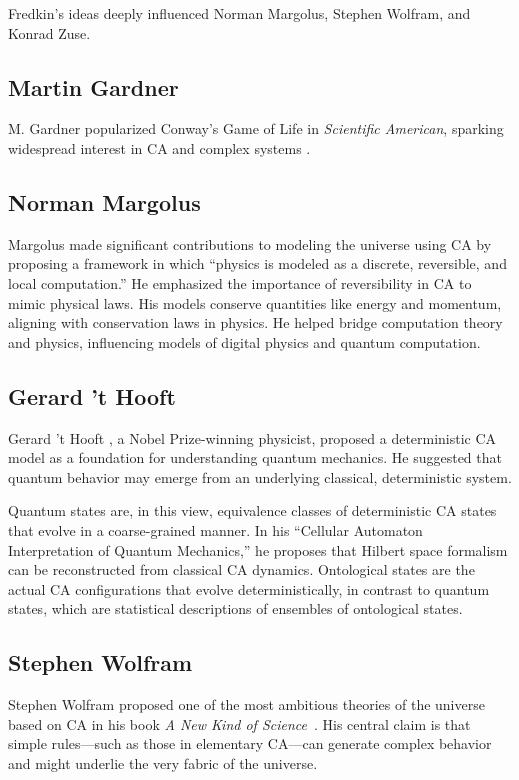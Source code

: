 \documentclass[12pt,english]{article}
\begin{document}
Fredkin’s ideas deeply influenced Norman Margolus, Stephen Wolfram, and Konrad Zuse.

\subsection*{Martin Gardner}
M. Gardner popularized Conway’s Game of Life in \emph{Scientific American}, sparking widespread interest in CA and complex systems \cite{gardner1970}.

\subsection*{Norman Margolus}
Margolus \cite{margolus} made significant contributions to modeling the universe using CA by proposing a framework in which ``physics is modeled as a discrete, reversible, and local computation.'' He emphasized the importance of reversibility in CA to mimic physical laws. His models conserve quantities like energy and momentum, aligning with conservation laws in physics. He helped bridge computation theory and physics, influencing models of digital physics and quantum computation.

\subsection*{Gerard 't Hooft}
Gerard 't Hooft \cite{thooft}, a Nobel Prize-winning physicist, proposed a deterministic CA model as a foundation for understanding quantum mechanics. He suggested that quantum behavior may emerge from an underlying classical, deterministic system.

Quantum states are, in this view, equivalence classes of deterministic CA states that evolve in a coarse-grained manner. In his ``Cellular Automaton Interpretation of Quantum Mechanics,'' he proposes that Hilbert space formalism can be reconstructed from classical CA dynamics. Ontological states are the actual CA configurations that evolve deterministically, in contrast to quantum states, which are statistical descriptions of ensembles of ontological states.

\subsection*{Stephen Wolfram}
Stephen Wolfram proposed one of the most ambitious theories of the universe based on CA in his book \emph{A New Kind of Science}~\cite{wolfram}. His central claim is that simple rules—such as those in elementary CA—can generate complex behavior and might underlie the very fabric of the universe.
\end{document}
